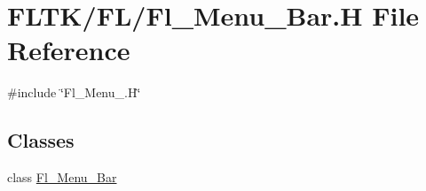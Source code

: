 \hypertarget{_fl___menu___bar_8_h}{}\section{F\+L\+T\+K/\+F\+L/\+Fl\+\_\+\+Menu\+\_\+\+Bar.H File Reference}
\label{_fl___menu___bar_8_h}
{\ttfamily \#include \char`\"{}Fl\+\_\+\+Menu\+\_\+.\+H\char`\"{}}\newline
\subsection*{Classes}
\begin{DoxyCompactItemize}
\item 
class \hyperlink{class_fl___menu___bar}{Fl\+\_\+\+Menu\+\_\+\+Bar}
\end{DoxyCompactItemize}
